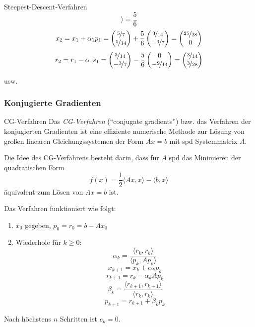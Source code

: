 \begin{example}{Steepest-Descent-Verfahren}
\[{            \rangle} = \frac{5}{6}
    \]
    \[
        x_{2} = x_1 + \alpha_1 p_1 =
        \begin{pmatrix}
            \nicefrac{5}{7} \\ \nicefrac{5}{14}
        \end{pmatrix}
        +\frac{5}{6}
        \begin{pmatrix}
            \nicefrac{3}{14} \\ -\nicefrac{3}{7}
        \end{pmatrix}
        =
        \begin{pmatrix}
            \nicefrac{25}{28} \\ 0
        \end{pmatrix}
    \]
    \[
        r_{2} = r_1 - \alpha_1 s_1 =
        \begin{pmatrix}
            \nicefrac{3}{14} \\ -\nicefrac{3}{7}
        \end{pmatrix}
        - \frac{5}{6}
        \begin{pmatrix}
            0 \\ -\nicefrac{9}{14}
        \end{pmatrix}
        = \begin{pmatrix}
            \nicefrac{3}{14} \\ \nicefrac{3}{28}
        \end{pmatrix}
    \]

    usw.
\end{example}

\subsubsection{Konjugierte Gradienten}

\begin{defi}{CG-Verfahren}
    Das \emph{CG-Verfahren} (\enquote{conjugate gradients}) bzw. das Verfahren der konjugierten Gradienten ist eine effiziente numerische Methode zur Lösung von großen linearen Gleichungssystemen der Form $A x = b$ mit spd Systemmatrix $A$.

    Die Idee des CG-Verfahrens besteht darin, dass für $A$ spd das Minimieren der quadratischen Form
    \[
        f(x) = \frac{1}{2} \langle Ax, x \rangle - \langle b, x \rangle
    \]
    äquivalent zum Lösen von $A x = b$ ist.

    Das Verfahren funktioniert wie folgt:
    \begin{enumerate}
        \item $x_0$ gegeben, $p_0 = r_0 = b - Ax_0$
        \item Wiederhole für $k \geq 0$:
              \[ \alpha_k = \frac{\langle r_k, r_k \rangle}{\langle p_k, A p_k \rangle} \]
              \[ x_{k+1} = x_k + \alpha_k p_k \]
              \[ r_{k+1} = r_k - \alpha_k A p_k \]
              \[ \beta_k = \frac{\langle r_{k+1}, r_{k+1} \rangle}{\langle r_k, r_k \rangle} \]
              \[ p_{k+1} = r_{k+1} + \beta_k p_k \]
    \end{enumerate}

    Nach höchstens $n$ Schritten ist $e_k = 0$.
\end{defi}

